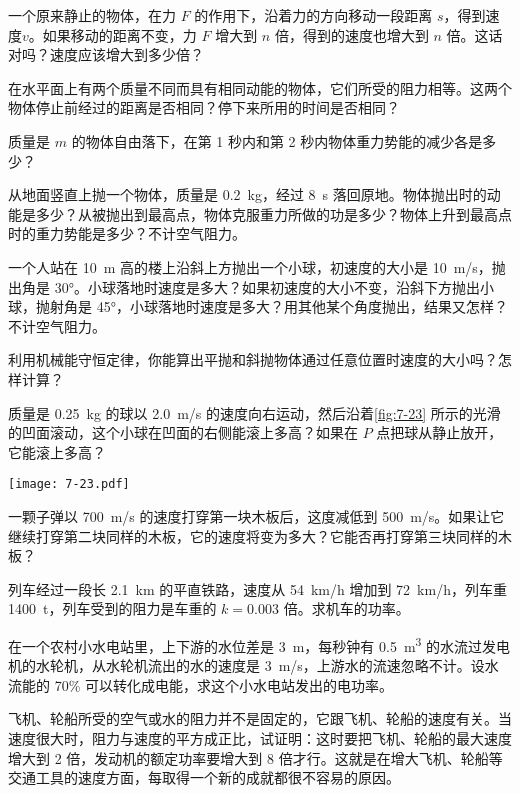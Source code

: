 \begin{Exercise}
\begin{question}
  \item 一个原来静止的物体，在力 $F$ 的作用下，沿着力的方向移动一段距离 $s$，得到速度$v$。如果移动的距离不变，力 $F$ 增大到 $n$ 倍，得到的速度也增大到 $n$ 倍。这话对吗？速度应该增大到多少倍？
  \item 在水平面上有两个质量不同而具有相同动能的物体，它们所受的阻力相等。这两个物体停止前经过的距离是否相同？停下来所用的时间是否相同？
  \item 质量是 $m$ 的物体自由落下，在第 1 秒内和第 2 秒内物体重力势能的减少各是多少？
  \item 从地面竖直上抛一个物体，质量是 \qty{0.2}{kg}，经过 \qty{8}{s} 落回原地。物体抛出时的动能是多少？从被抛出到最高点，物体克服重力所做的功是多少？物体上升到最高点时的重力势能是多少？不计空气阻力。
  \item 一个人站在 \qty{10}{m} 高的楼上沿斜上方抛出一个小球，初速度的大小是 \qty{10}{m/s}，抛出角是 \ang{30}。小球落地时速度是多大？如果初速度的大小不变，沿斜下方抛出小球，抛射角是 \ang{45}，小球落地时速度是多大？用其他某个角度抛出，结果又怎样？不计空气阻力。
  \item 利用机械能守恒定律，你能算出平抛和斜抛物体通过任意位置时速度的大小吗？怎样计算？
  \item 质量是 \qty{0.25}{kg} 的球以 \qty{2.0}{m/s} 的速度向右运动，然后沿着\cref{fig:7-23} 所示的光滑的凹面滚动，这个小球在凹面的右侧能滚上多高？如果在 $P$ 点把球从静止放开，它能滚上多高？
  \begin{figurehere}
    \begin{minipage}{\linewidth}\centering
      \texttt{[image: 7-23.pdf]}
      \caption{}\label{fig:7-23}
    \end{minipage}
  \end{figurehere}
  \item  一颗子弹以 \qty{700}{m/s} 的速度打穿第一块木板后，这度减低到 \qty{500}{m/s}。如果让它继续打穿第二块同样的木板，它的速度将变为多大？它能否再打穿第三块同样的木板？
  \item  列车经过一段长 \qty{2.1}{km} 的平直铁路，速度从 \qty{54}{km/h} 增加到 \qty{72}{km/h}，列车重 \qty{1400}{t}，列车受到的阻力是车重的 $k=0.003$ 倍。求机车的功率。
  \item  在一个农村小水电站里，上下游的水位差是 \qty{3}{m}，每秒钟有 \qty{0.5}{m^3} 的水流过发电机的水轮机，从水轮机流出的水的速度是 \qty{3}{m/s}，上游水的流速忽略不计。设水流能的 70\% 可以转化成电能，求这个小水电站发出的电功率。
  \item  飞机、轮船所受的空气或水的阻力并不是固定的，它跟飞机、轮船的速度有关。当速度很大时，阻力与速度的平方成正比，试证明：这时要把飞机、轮船的最大速度增大到 2 倍，发动机的额定功率要增大到 8 倍才行。这就是在增大飞机、轮船等交通工具的速度方面，每取得一个新的成就都很不容易的原因。

\end{question}
\end{Exercise}
